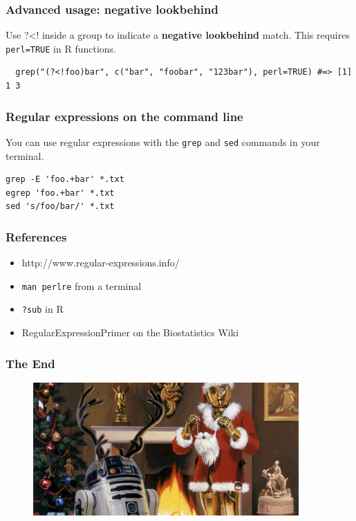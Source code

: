 \documentclass{beamer}
\begin{document}
\begin{frame}[fragile]
  \frametitle{Advanced usage: negative lookbehind}
  Use ?<! inside a group to indicate a \textbf{negative lookbehind} match. This requires \texttt{perl=TRUE} in R functions.
  \vspace{3mm}

\begin{verbatim}
  grep("(?<!foo)bar", c("bar", "foobar", "123bar"), perl=TRUE) #=> [1] 1 3
\end{verbatim}
\end{frame}
\begin{frame}[fragile]
  \frametitle{Regular expressions on the command line}
  You can use regular expressions with the \texttt{grep} and \texttt{sed} commands in your terminal.
  \vspace{3mm}

\begin{verbatim}
grep -E 'foo.+bar' *.txt
egrep 'foo.+bar' *.txt
sed 's/foo/bar/' *.txt
\end{verbatim}
\end{frame}
\begin{frame}
  \frametitle{References}
  \begin{itemize}
    \item http://www.regular-expressions.info/
    \item \texttt{man perlre} from a terminal
    \item \texttt{?sub} in R
    \item RegularExpressionPrimer on the Biostatistics Wiki
  \end{itemize}
\end{frame}
\begin{frame}
  \frametitle{The End}
  \begin{figure}[h]
    \centering
    \includegraphics[width=4in]{"star-wars-christmas"}
  \end{figure}
\end{frame}
\end{document}
